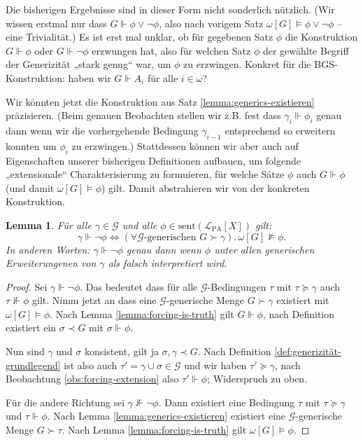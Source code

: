 \documentclass[nofonts]{uebung}
\newtheorem{lemma}[theorem]{Lemma}
\theoremstyle{definition}
\begin{document}
Die bisherigen Ergebnisse sind in dieser Form nicht sonderlich nützlich. (Wir wissen erstmal nur dass $G\Vdash \phi\lor\neg\phi$, also nach vorigem Satz $\omega[G] \vDash \phi\lor\neg\phi$ -- eine Trivialität.)
Es ist erst mal unklar, ob für gegebenen Satz $\phi$ die Konstruktion $G\Vdash \phi$ oder $G\Vdash\neg\phi$ erzwungen hat, also für welchen Satz $\phi$ der gewählte Begriff der Generizität „stark genug“ war, um $\phi$ zu erzwingen.  Konkret für die BGS-Konstruktion: haben wir $G\Vdash A_i$ für alle $i\in\omega$?

Wir könnten jetzt die Konstruktion aus Satz \ref{lemma:generics-existieren} präzisieren. (Beim genauen Beobachten stellen wir z.B. fest dass $\gamma_i\Vdash\phi_i$ genau dann wenn wir die vorhergehende Bedingung $\gamma_{i-1}$ entsprechend so erweitern konnten um $\phi_i$ zu erzwingen.)
Stattdessen können wir aber auch auf Eigenschaften unserer bisherigen Definitionen aufbauen, um folgende „extensionale“ Charakterisierung zu formuieren, für welche Sätze $\phi$ auch $G\Vdash \phi$ (und damit $\omega[G]\vDash\phi$) gilt. Damit abstrahieren wir von der konkreten Konstruktion.


\begin{lemma}\label{lemma:single-negation-contradicts}
    Für alle $\gamma\in\mathcal G$ und alle $\phi\in \mathrm{sent}(\mathcal L_{\mathrm{PA}}[X])$ gilt:
    \[ \gamma\Vdash\neg\phi \iff (\forall\text{$\mathcal G$-generischen $G\succ\gamma$}).\, \omega[G]\not\vDash \phi. \]
    In anderen Worten: $\gamma\Vdash\neg\phi$ genau dann wenn $\phi$ unter allen generischen Erweiterungenen von $\gamma$ als falsch interpretiert wird.
\end{lemma}
\begin{proof}
    Sei $\gamma\Vdash\neg\phi$. Das bedeutet dass für alle $\mathcal G$-Bedingungen $\tau$ mit $\tau\succeq\gamma$ auch $\tau\not\Vdash \phi$ gilt.
    Nimm jetzt an dass eine $\mathcal G$-generische Menge $G\succ\gamma$ existiert mit $\omega[G]\vDash\phi$.
    Nach Lemma \ref{lemma:forcing-is-truth} gilt $G\Vdash\phi$, nach Definition existiert ein $\sigma\prec G$ mit $\sigma\Vdash\phi$.

    Nun sind $\gamma$ und $\sigma$ konsistent, gilt ja $\sigma,\gamma\prec G$.
    Nach Definition \ref{def:generizität-grundlegend} ist also auch $\tau'=\gamma\cup\sigma\in\mathcal G$ und wir haben $\tau'\succeq\gamma$, nach Beobachtung \ref{obs:forcing-extension} also $\tau'\Vdash\phi$; Widerspruch zu oben.

    Für die andere Richtung sei $\gamma\not\Vdash\neg\phi$. Dann existiert eine Bedingung $\tau$ mit $\tau\succeq\gamma$ und $\tau\Vdash\phi$.
    Nach Lemma \ref{lemma:generics-existieren} existiert eine $\mathcal G$-generische Menge $G\succ \tau$. Nach Lemma \ref{lemma:forcing-is-truth} gilt $\omega[G]\vDash\phi$.
\end{proof}
\end{document}
